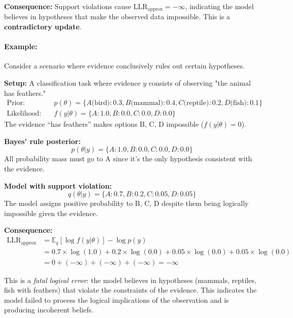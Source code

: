\documentclass{article}
\theoremstyle{definition}
\begin{document}
\textbf{Consequence:} Support violations cause $\text{LLR}_{\text{approx}} = -\infty$, indicating the model believes in hypotheses that make the observed data impossible. This is a \textbf{contradictory update}.

\paragraph{Example:} Consider a scenario where evidence conclusively rules out certain hypotheses.

\textbf{Setup:}
A classification task where evidence $y$ consists of observing "the animal has feathers."
\begin{align*}
\text{Prior:} \quad &p(\theta) = \{A\text{(bird)}: 0.3, B\text{(mammal)}: 0.4, C\text{(reptile)}: 0.2, D\text{(fish)}: 0.1\} \\
\text{Likelihood:} \quad &f(y|\theta) = \{A: 1.0, B: 0.0, C: 0.0, D: 0.0\}
\end{align*}
The evidence ``has feathers'' makes options B, C, D impossible ($f(y|\theta) = 0$).

\textbf{Bayes' rule posterior:}
\begin{equation*}
p(\theta|y) = \{A: 1.0, B: 0.0, C: 0.0, D: 0.0\}
\end{equation*}
All probability mass must go to A since it's the only hypothesis consistent with the evidence.

\textbf{Model with support violation:}
\begin{equation*}
q(\theta|y) = \{A: 0.7, B: 0.2, C: 0.05, D: 0.05\}
\end{equation*}
The model assigns positive probability to B, C, D despite them being logically impossible given the evidence.

\textbf{Consequence:}
\begin{align*}
\text{LLR}_{\text{approx}} &= \mathbb{E}_{q}[\log f(y|\theta)] - \log p(y) \\
&= 0.7 \times \log(1.0) + 0.2 \times \log(0.0) + 0.05 \times \log(0.0) + 0.05 \times \log(0.0) \\
&= 0 + (-\infty) + (-\infty) + (-\infty) = -\infty
\end{align*}

This is a \emph{fatal logical error}: the model believes in hypotheses (mammals, reptiles, fish with feathers) that violate the constraints of the evidence. This indicates the model failed to process the logical implications of the observation and is producing incoherent beliefs.
\end{document}
